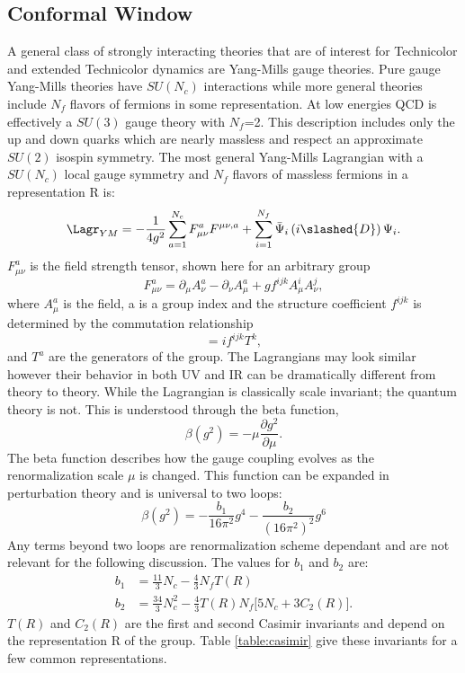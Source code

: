 \subsection{Conformal Window}
\label{sec:sec:conformalwindow}
A general class of strongly interacting theories that are of interest for Technicolor and extended Technicolor dynamics are Yang-Mills gauge theories.
Pure gauge Yang-Mills theories have $SU(N_c)$ interactions while more general theories include $N_f$ flavors of fermions in some representation.
At low energies QCD is effectively a $SU(3)$ gauge theory with $N_f$=2.
This description includes only the up and down quarks which are nearly massless and respect an approximate $SU(2)$ isospin symmetry.
The most general Yang-Mills Lagrangian with a $SU(N_c)$ local gauge symmetry and $N_f$ flavors of massless fermions in a representation R is:
\begin{equation}
  \Lagr_{YM}=-\frac{1}{4g^2}\sum\limits_{a=1}^{N_c} F^a_{\mu\nu}F^{\mu\nu,a}+\sum\limits_{i=1}^{N_f} \bar\Psi_i\left(i\slashed{D}\right)\Psi_i.  
\end{equation}
$F^a_{\mu\nu}$ is the field strength tensor, shown here for an arbitrary group
\begin{equation}
  F^a_{\mu\nu}=\partial_\mu A^a_\nu-\partial_\nu A^a_\mu + gf^{ijk}A^i_\mu A^j_\nu,
\end{equation}
where $A^a_\mu$ is the field, a is a group index and the structure coefficient $f^{ijk}$ is determined by the commutation relationship
\begin{equation}
  [T^i,T^j]=if^{ijk}T^k,
\end{equation}
and $T^a$ are the generators of the group.
The Lagrangians may look similar however their behavior in both UV and IR can be dramatically different from theory to theory.
While the Lagrangian is classically scale invariant; the quantum theory is not.
This is understood through the beta function,
\begin{equation}
  \beta (g^2)=-\mu\frac{\partial g^2}{\partial \mu}.
\end{equation}
The beta function describes how the gauge coupling evolves as the renormalization scale $\mu$ is changed.
This function can be expanded in perturbation theory and is universal to two loops:
\begin{equation}
  \beta\left(g^2\right)=-\frac{b_1}{16\pi^2}g^4-\frac{b_2}{(16\pi^2)^2}g^6
\end{equation}
Any terms beyond two loops are renormalization scheme dependant and are not relevant for the following discussion.
The values for $b_1$ and $b_2$ are:
\begin{equation}
  \begin{aligned}
    b_1&=\frac{11}{3}N_c-\frac{4}{3}N_fT(R)\\
    b_2&=\frac{34}{3}N_c^2-\frac{4}{3}T(R)N_f\Big[5N_c+3C_2(R)\Big].
  \end{aligned}
\end{equation}
$T(R)$ and $C_2(R)$ are the first and second Casimir invariants and depend on the representation R of the group.
Table \ref{table:casimir} give these invariants for a few common representations.

